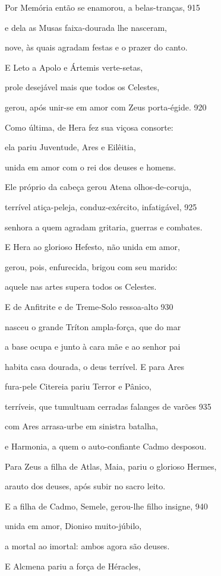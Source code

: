 \quad{}Por Memória então se enamorou, a belas-tranças, \num{915}

e dela as Musas faixa-dourada lhe nasceram,

nove, às quais agradam festas e o prazer do canto.

\quad{}E Leto a Apolo e Ártemis verte-setas,

prole desejável mais que todos os Celestes,

gerou, após unir-se em amor com Zeus porta-égide. \num{920}

\quad{}Como última, de Hera fez sua viçosa consorte:

ela pariu Juventude, Ares e Eilêitia,

unida em amor com o rei dos deuses e homens.

\quad{}Ele próprio da cabeça gerou Atena olhos-de-coruja,

terrível atiça-peleja, conduz-exército, infatigável, \num{925}

senhora a quem agradam gritaria, guerras e combates.

E Hera ao glorioso Hefesto, não unida em amor,

gerou, pois, enfurecida, brigou com seu marido:

aquele nas artes supera todos os Celestes.

\quad{}E de Anfitrite e de Treme-Solo ressoa-alto \num{930}

nasceu o grande Tríton ampla-força, que do mar

a base ocupa e junto à cara mãe e ao senhor pai

habita casa dourada, o deus terrível. E para Ares

fura-pele Citereia pariu Terror e Pânico,

terríveis, que tumultuam cerradas falanges de varões \num{935}

com Ares arrasa-urbe em sinistra batalha,

e Harmonia, a quem o auto-confiante Cadmo desposou.

\quad{}Para Zeus a filha de Atlas, Maia, pariu o glorioso Hermes,

arauto dos deuses, após subir no sacro leito.

\quad{}E a filha de Cadmo, Semele, gerou-lhe filho insigne, \num{940}

unida em amor, Dioniso muito-júbilo,

a mortal ao imortal: ambos agora são deuses.

\quad{}E Alcmena pariu a força de Héracles,


